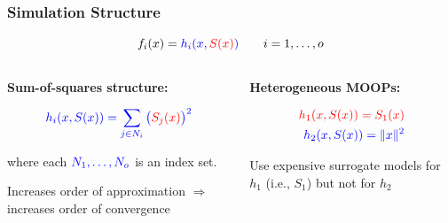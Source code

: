\documentclass[aspectratio=169]{beamer}
\begin{document}
\begin{frame}\frametitle{Simulation Structure}
\pause
{\Large
$$
f_i(x) = {\color{blue}h_i(x, {\color{red}S(x)} )}
\qquad i = 1, \ldots, o
$$
}
\begin{columns}
\begin{column}{0.5\textwidth}
\pause
\textbf{Sum-of-squares structure:}

\medskip

{\large
$$
{\color{blue} h_i(x, S(x)) = \sum_{j \in N_i} \big({\color{red}S_j(x)}\big)^2}
$$

where each ${\color{blue} N_1, \ldots, N_o}$ is an index set.
}

\bigskip

Increases order of approximation $\Rightarrow$
increases order of convergence

\end{column}
\begin{column}{0.5\textwidth}
\pause
\textbf{Heterogeneous MOOPs:}

{\large
\begin{align*}
{\color{red} h_1(x, S(x)) = S_1(x)}\\
{\color{blue} h_2(x, S(x)) = \|x \|^2}
\end{align*}
}

Use expensive surrogate models for {\color{red} $h_1$} (i.e.,
{\color{red} $S_1$}) but not for {\color{blue} $h_2$}

\end{column}
\end{columns}
\end{frame}
\end{document}
